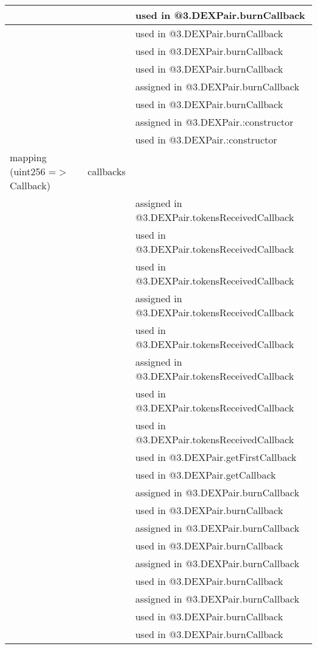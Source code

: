 \begin{tabular}{|l|l|p{5cm}|}
 & & used in @3.DEXPair.burnCallback\\\hline
 & & used in @3.DEXPair.burnCallback\\\hline
 & & used in @3.DEXPair.burnCallback\\\hline
 & & used in @3.DEXPair.burnCallback\\\hline
 & & assigned in @3.DEXPair.burnCallback\\\hline
 & & used in @3.DEXPair.burnCallback\\\hline
 & & assigned in @3.DEXPair.:constructor\\\hline
 & & used in @3.DEXPair.:constructor\\\hline
mapping (uint256 =$>$ Callback) & callbacks &  \\\hline
 & & assigned in @3.DEXPair.tokensReceivedCallback\\\hline
 & & used in @3.DEXPair.tokensReceivedCallback\\\hline
 & & used in @3.DEXPair.tokensReceivedCallback\\\hline
 & & assigned in @3.DEXPair.tokensReceivedCallback\\\hline
 & & used in @3.DEXPair.tokensReceivedCallback\\\hline
 & & assigned in @3.DEXPair.tokensReceivedCallback\\\hline
 & & used in @3.DEXPair.tokensReceivedCallback\\\hline
 & & used in @3.DEXPair.tokensReceivedCallback\\\hline
 & & used in @3.DEXPair.getFirstCallback\\\hline
 & & used in @3.DEXPair.getCallback\\\hline
 & & assigned in @3.DEXPair.burnCallback\\\hline
 & & used in @3.DEXPair.burnCallback\\\hline
 & & assigned in @3.DEXPair.burnCallback\\\hline
 & & used in @3.DEXPair.burnCallback\\\hline
 & & assigned in @3.DEXPair.burnCallback\\\hline
 & & used in @3.DEXPair.burnCallback\\\hline
 & & assigned in @3.DEXPair.burnCallback\\\hline
 & & used in @3.DEXPair.burnCallback\\\hline
 & & used in @3.DEXPair.burnCallback\\\hline
\end{tabular}
\fi


